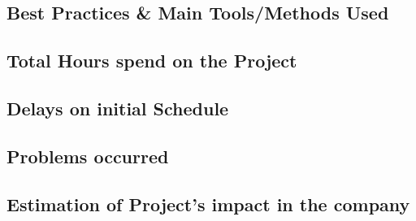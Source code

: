 \subsection{Best Practices \& Main Tools/Methods Used}

\subsection{Total Hours spend on the Project}

\subsection{Delays on initial Schedule}

\subsection{Problems occurred}

\subsection{Estimation of Project's impact in the company}

